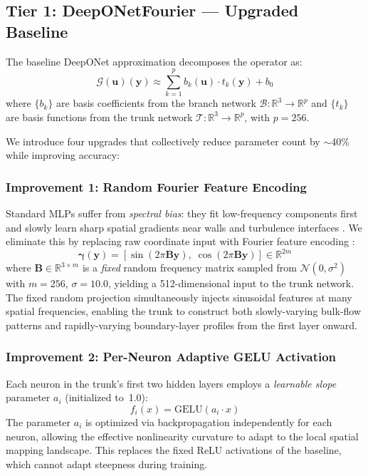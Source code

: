 \documentclass[conference]{IEEEtran}
\begin{document}
\subsection{Tier 1: DeepONetFourier --- Upgraded Baseline}
\label{sec:deeponet_fourier}

The baseline DeepONet approximation \cite{lu2021deeponet, chen1995} decomposes the operator as:
\begin{equation}
\mathcal{G}(\bm{u})(\bm{y}) \approx \sum_{k=1}^{p} b_k(\bm{u}) \cdot t_k(\bm{y}) + b_0
\label{eq:deeponet_base}
\end{equation}
where $\{b_k\}$ are basis coefficients from the branch network $\mathcal{B}: \mathbb{R}^3 \to \mathbb{R}^p$ and $\{t_k\}$ are basis functions from the trunk network $\mathcal{T}: \mathbb{R}^3 \to \mathbb{R}^p$, with $p = 256$.

We introduce four upgrades that collectively reduce parameter count by $\sim$40\% while improving accuracy:

\subsubsection{Improvement 1: Random Fourier Feature Encoding}
Standard MLPs suffer from \emph{spectral bias}: they fit low-frequency components first and slowly learn sharp spatial gradients near walls and turbulence interfaces \cite{rahaman2019spectral}. We eliminate this by replacing raw coordinate input with Fourier feature encoding \cite{tancik2020ffn}:
\begin{equation}
\bm{\gamma}(\bm{y}) = \left[\sin(2\pi \bm{B}\bm{y}),\;\cos(2\pi \bm{B}\bm{y})\right] \in \mathbb{R}^{2m}
\label{eq:fourier}
\end{equation}
where $\bm{B} \in \mathbb{R}^{3 \times m}$ is a \emph{fixed} random frequency matrix sampled from $\mathcal{N}(0, \sigma^2)$ with $m = 256$, $\sigma = 10.0$, yielding a 512-dimensional input to the trunk network. The fixed random projection simultaneously injects sinusoidal features at many spatial frequencies, enabling the trunk to construct both slowly-varying bulk-flow patterns and rapidly-varying boundary-layer profiles from the first layer onward.

\subsubsection{Improvement 2: Per-Neuron Adaptive GELU Activation}
Each neuron in the trunk's first two hidden layers employs a \emph{learnable slope} parameter $a_i$ (initialized to~1.0):
\begin{equation}
f_i(x) = \text{GELU}(a_i \cdot x)
\label{eq:adaptive_gelu}
\end{equation}
The parameter $a_i$ is optimized via backpropagation independently for each neuron, allowing the effective nonlinearity curvature to adapt to the local spatial mapping landscape. This replaces the fixed ReLU activations of the baseline, which cannot adapt steepness during training.
\end{document}
